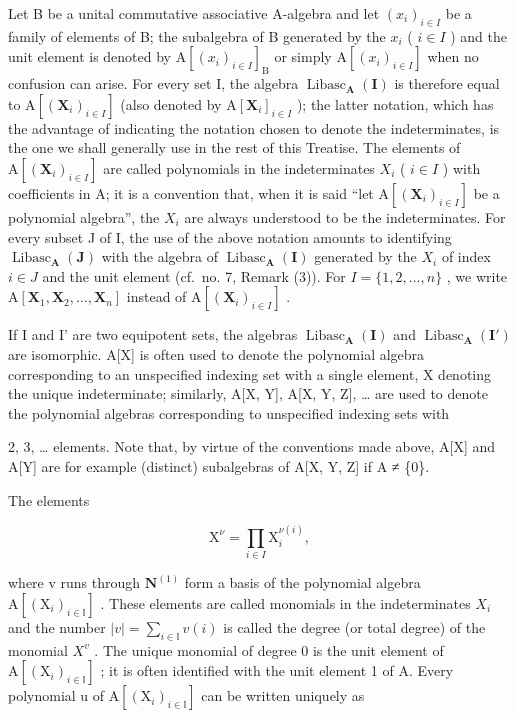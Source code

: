 Let B be a unital commutative associative A-algebra and let \((x_{i})_{i\in I}\) be a family of elements of B; the subalgebra of B generated by the \(x_{i}\) ( \(i\in I\) ) and the unit element is denoted by \(\mathrm{A}[(x_{i})_{i\in I}]_{\mathrm{B}}\) or simply \(\mathrm{A}[(x_{i})_{i\in I}]\) when no confusion can arise. For every set I, the algebra \(\operatorname{Libasc}_{\mathbf{A}}(\mathbf{I})\) is therefore equal to \(\mathrm{A}[(\mathbf{X}_{i})_{i\in I}]\) (also denoted by \(\mathrm{A}[\mathbf{X}_{i}]_{i\in I}\) ); the latter notation, which has the advantage of indicating the notation chosen to denote the indeterminates, is the one we shall generally use in the rest of this Treatise. The elements of \(\mathrm{A}[(\mathbf{X}_{i})_{i\in I}]\) are called polynomials in the indeterminates \(X_{i}\) ( \(i\in I\) ) with coefficients in A; it is a convention that, when it is said ``let \(\mathrm{A}[(\mathbf{X}_{i})_{i\in I}]\) be a polynomial algebra'', the \(X_{i}\) are always understood to be the indeterminates. For every subset J of I, the use of the above notation amounts to identifying \(\operatorname{Libasc}_{\mathbf{A}}(\mathbf{J})\) with the algebra of \(\operatorname{Libasc}_{\mathbf{A}}(\mathbf{I})\) generated by the \(X_{i}\) of index \(i\in J\) and the unit element (cf.~no. 7, Remark (3)). For \(I=\{1,2,\ldots,n\}\) , we write \(\mathrm{A}[\mathbf{X}_{1},\mathbf{X}_{2},\ldots,\mathbf{X}_{n}]\) instead of \(\mathrm{A}[(\mathbf{X}_{i})_{i\in I}]\) .

If I and I' are two equipotent sets, the algebras \(\operatorname{Libasc}_{\mathbf{A}}(\mathbf{I})\) and \(\operatorname{Libasc}_{\mathbf{A}}(\mathbf{I}')\) are isomorphic. A{[}X{]} is often used to denote the polynomial algebra corresponding to an unspecified indexing set with a single element, X denoting the unique indeterminate; similarly, A{[}X, Y{]}, A{[}X, Y, Z{]}, \ldots{} are used to denote the polynomial algebras corresponding to unspecified indexing sets with

2, 3, \ldots{} elements. Note that, by virtue of the conventions made above, A{[}X{]} and A{[}Y{]} are for example (distinct) subalgebras of A{[}X, Y, Z{]} if A ≠ \{0\}.

The elements

\[
\mathrm{X} ^ {\nu} = \prod_ {i \in I} \mathrm{X} _ {i} ^ {\nu (i)},
\]

where v runs through \(\mathbf{N}^{(1)}\) form a basis of the polynomial algebra \(\mathrm{A}[(\mathrm{X}_{i})_{i\in\mathbb{I}}]\) . These elements are called monomials in the indeterminates \(X_{i}\) and the number \(|v|=\sum_{i\in\mathbb{I}}v(i)\) is called the degree (or total degree) of the monomial \(X^{v}\) . The unique monomial of degree 0 is the unit element of \(\mathrm{A}[(\mathrm{X}_{i})_{i\in\mathbb{I}}]\) ; it is often identified with the unit element 1 of A. Every polynomial u of \(\mathrm{A}[(\mathrm{X}_{i})_{i\in\mathbb{I}}]\) can be written uniquely as

